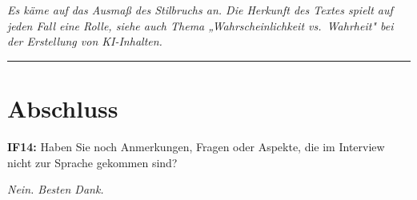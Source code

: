 \textit{Es käme auf das Ausmaß des Stilbruchs an. Die Herkunft des Textes spielt auf jeden Fall eine Rolle, siehe auch Thema „Wahrscheinlichkeit vs.\ Wahrheit" bei der Erstellung von KI-Inhalten.}

\begin{center}\rule{0.5\linewidth}{0.5pt}\end{center}

\section{Abschluss}

\textbf{IF14:} Haben Sie noch Anmerkungen, Fragen oder Aspekte, die im Interview nicht zur Sprache gekommen sind?

\textit{Nein. Besten Dank.}